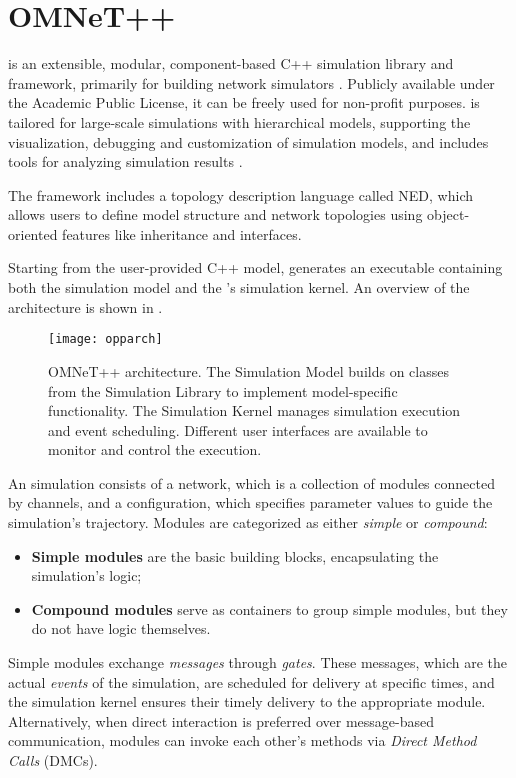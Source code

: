 \section{OMNeT++}\label{sec:omnetpp}

\omnetpp{} is an extensible, modular, component-based C++ simulation library
and framework, primarily for building network simulators
\cite{omnetpp-simulation-manual}. Publicly available under the Academic Public
License, it can be freely used for non-profit purposes. \omnetpp{} is tailored
for large-scale simulations with hierarchical models, supporting the
visualization, debugging and customization of simulation models, and includes
tools for analyzing simulation results \cite{omnetpp}.

The framework includes a topology description language called NED, which allows
users to define model structure and network topologies using object-oriented
features like inheritance and interfaces.

Starting from the user-provided C++ model, \omnetpp{} generates an executable
containing both the simulation model and the \omnetpp{}'s simulation kernel. An
overview of the \omnetpp{} architecture is shown in
.

\begin{figure}[tbhp]
	\centering
	\texttt{[image: opparch]}
	\caption{OMNeT++ architecture. The Simulation Model builds on classes
	from the Simulation Library to implement model-specific functionality.
	The Simulation Kernel manages simulation execution and event
	scheduling. Different user interfaces are available to monitor and
	control the execution.}\label{fig:omnetpp-architecture}
\end{figure}

An \omnetpp{} simulation consists of a network, which is a collection of
modules connected by channels, and a configuration, which specifies parameter
values to guide the simulation's trajectory. Modules are categorized as either
\emph{simple} or \emph{compound}:
\begin{itemize}
	\item \textbf{Simple modules} are the basic building blocks,
		encapsulating the simulation's logic;
	\item \textbf{Compound modules} serve as containers to group simple
		modules, but they do not have logic themselves.
\end{itemize}

Simple modules exchange \emph{messages} through \emph{gates}. These messages,
which are the actual \emph{events} of the simulation, are scheduled for
delivery at specific times, and the simulation kernel ensures their timely
delivery to the appropriate module. Alternatively, when direct interaction is
preferred over message-based communication, modules can invoke each other's
methods via \emph{Direct Method Calls} (DMCs).

